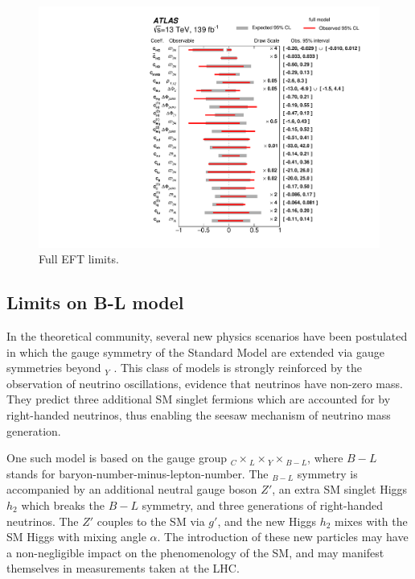 \begin{figure}
    \centering
    \includegraphics[width=\mediumfigwidth]{Figures/m4l/Interpretations/EFTLimits_MVozak.pdf}
    \caption{Full EFT limits.}
    \label{fig:EFTfull}
\end{figure}

\subsection{Limits on B-L model}

In the theoretical community, several new physics scenarios have been postulated in which the gauge symmetry of the Standard Model are extended via  gauge symmetries beyond $_Y$ \cite{}. This class of models is strongly reinforced by the observation of neutrino oscillations, evidence that neutrinos have non-zero mass. They predict three additional SM singlet fermions which are accounted for by right-handed neutrinos, thus enabling the seesaw mechanism of neutrino mass generation. 

One such model is based on the gauge group $_C\times$$_L\times$$_Y\times$$_{B-L}$, where $B-L$ stands for baryon-number-minus-lepton-number. The $_{B-L}$ symmetry is accompanied by an additional neutral gauge boson $Z'$, an extra SM singlet Higgs $h_2$ which breaks the $B-L$ symmetry, and three generations of right-handed neutrinos. The $Z'$ couples to the SM via $g'$, and the new Higgs $h_2$ mixes with the SM Higgs with mixing angle $\alpha$. The introduction of these new particles may have a non-negligible impact on the phenomenology of the SM, and may manifest themselves in measurements taken at the LHC. 

